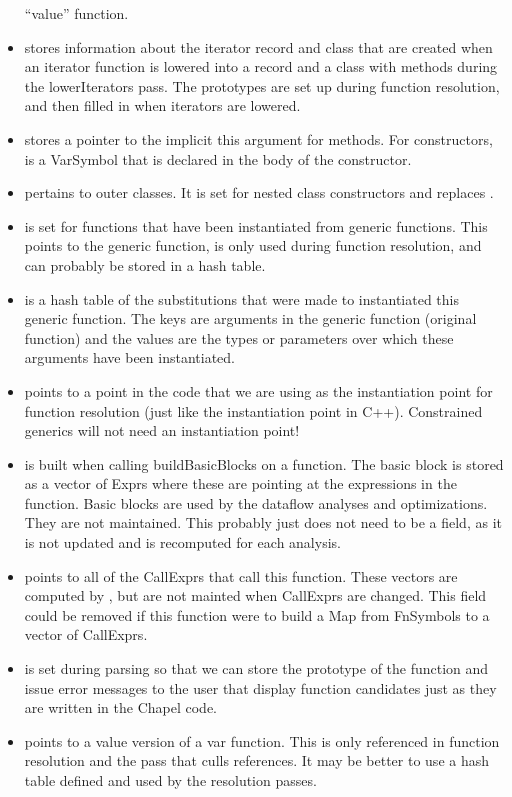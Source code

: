 \documentclass[10pt]{article}
\begin{document}
\begin{itemize}
  ``value'' function.
\item {} stores information about the
  iterator record and class that are created when an iterator function
  is lowered into a record and a class with methods during the
  lowerIterators pass.  The prototypes are set up during function
  resolution, and then filled in when iterators are lowered.
\item {} stores a pointer to the implicit this
  argument for methods.  For constructors,  is a VarSymbol
    that is declared in the body of the constructor.
\item {} pertains to outer classes.  It is set for
  nested class constructors and replaces .
\item {} is set for functions that have
  been instantiated from generic functions.  This points to the
  generic function, is only used during function resolution, and can
  probably be stored in a hash table.
\item {} is a hash table of the
  substitutions that were made to instantiated this generic function.
  The keys are arguments in the generic function (original function)
  and the values are the types or parameters over which these
  arguments have been instantiated.
\item {} points to a point in the code
  that we are using as the instantiation point for function resolution
  (just like the instantiation point in C++).  Constrained generics
  will not need an instantiation point!
\item {} is built when calling
  buildBasicBlocks on a function.  The basic block is stored as a
  vector of Exprs where these are pointing at the expressions in the
  function.  Basic blocks are used by the dataflow analyses and
  optimizations.  They are not maintained.  This probably just does
  not need to be a field, as it is not updated and is recomputed for
  each analysis.
\item {} points to all of the CallExprs
  that call this function.  These vectors are computed by
  , but are not mainted when CallExprs are
  changed.  This field could be removed if this function were to build
  a Map from FnSymbols to a vector of CallExprs.
\item {} is set during parsing so that we can
  store the prototype of the function and issue error messages to the
  user that display function candidates just as they are written in
  the Chapel code.
\item {} points to a value version of a var
  function.  This is only referenced in function resolution and the
  pass that culls references.  It may be better to use a hash table
  defined and used by the resolution passes.
\end{itemize}
\end{document}

